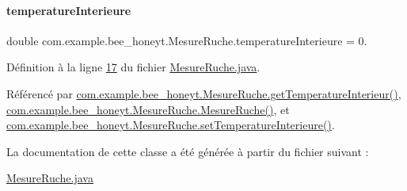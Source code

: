 \paragraph{\texorpdfstring{temperature\+Interieure}{temperatureInterieure}}
{\footnotesize\ttfamily double com.\+example.\+bee\+\_\+honeyt.\+Mesure\+Ruche.\+temperature\+Interieure = 0.\hspace{0.3cm}{\ttfamily [private]}}



Définition à la ligne \hyperlink{_mesure_ruche_8java_source_l00017}{17} du fichier \hyperlink{_mesure_ruche_8java_source}{Mesure\+Ruche.\+java}.



Référencé par \hyperlink{_mesure_ruche_8java_source_l00052}{com.\+example.\+bee\+\_\+honeyt.\+Mesure\+Ruche.\+get\+Temperature\+Interieur()}, \hyperlink{_mesure_ruche_8java_source_l00030}{com.\+example.\+bee\+\_\+honeyt.\+Mesure\+Ruche.\+Mesure\+Ruche()}, et \hyperlink{_mesure_ruche_8java_source_l00057}{com.\+example.\+bee\+\_\+honeyt.\+Mesure\+Ruche.\+set\+Temperature\+Interieure()}.



La documentation de cette classe a été générée à partir du fichier suivant \+:\begin{DoxyCompactItemize}
\item 
\hyperlink{_mesure_ruche_8java}{Mesure\+Ruche.\+java}\end{DoxyCompactItemize}

